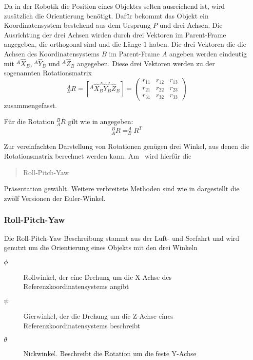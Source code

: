 Da in der Robotik die Position eines Objektes selten ausreichend ist, wird zusätzlich 
die Orientierung benötigt. Dafür bekommt das Objekt ein Koordinatensystem bestehend
aus dem Ursprung $P$ und drei Achsen. Die Ausrichtung der drei Achsen wirden durch
drei Vektoren im Parent-Frame angegeben, die orthogonal sind und die Länge $1$
haben. Die drei Vektoren die die Achsen des Koordinatensystems $B$ im Parent-Frame
$A$ angeben werden eindeutig mit $^A\hat{X}_B$, $^A\hat{Y}_B$ und $^A\hat{Z}_B$
angegeben. Diese drei Vektoren werden zu der sogenannten Rotationsmatrix
\begin{equation}
  ^A_BR = [ ^A\hat{X}_B ^A\hat{Y}_B ^A\hat{Z}_B ] = \begin{pmatrix}
    r_{11}&r_{12}&r_{13}\\
    r_{21}&r_{22}&r_{23}\\
    r_{31}&r_{32}&r_{33}
  \end{pmatrix}
  \label{eq:rotationsmatrix}
\end{equation}
zusammengefasst.

Für die Rotation $^B_AR$ gilt wie in \cite{craig2005} angegeben:
\begin{equation}
  ^B_AR=^A_BR^T
\end{equation}


Zur vereinfachten Darstellung von Rotationen genügen drei Winkel, aus denen die
Rotationsmatrix berechnet werden kann. Am \cob\ wird hierfür die \begin{quote}Roll-Pitch-Yaw\end{quote}
Präsentation gewählt. Weitere verbreitete Methoden sind wie in \cite{sciavicco2000modelling} 
dargestellt die zwölf Versionen der Euler-Winkel.

\subsubsection{Roll-Pitch-Yaw}
\label{ssub:Roll-Pitch-Yaw}

Die Roll-Pitch-Yaw Beschreibung stammt aus der Luft- und Seefahrt und wird genutzt
um die Orientierung eines Objekts mit den drei Winkeln 
\begin{description}
  \item[$\phi$]Rollwinkel, der eine Drehung um die X-Achse des Referenzkoordinatensystems
    angibt
  \item[$\psi$]Gierwinkel, der die Drehung um die Z-Achse eines Referenzkoordinatensystems
    beschreibt
  \item[$\theta$]Nickwinkel. Beschreibt die Rotation um die feste Y-Achse

\end{description}

